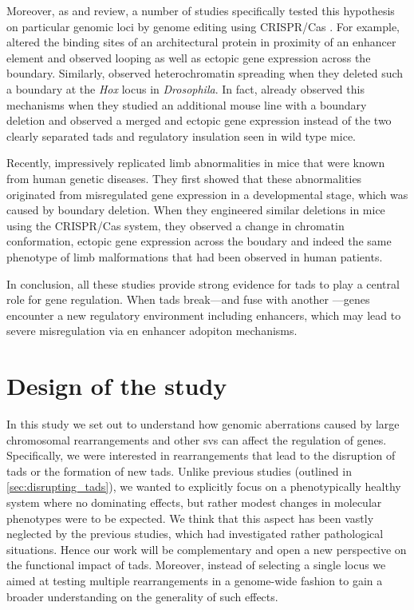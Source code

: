 Moreover, as \citet{Lupianez2016} and \citet{Krijger2016} review, a number of studies
specifically tested this hypothesis on particular genomic loci by genome
editing using CRISPR/Cas \citep{Doudna2014}. For example, \citet{Guo2015} altered
the binding sites of an architectural protein in proximity of an enhancer element
and observed looping as well as ectopic gene expression across the boundary.
Similarly, \citet{Narendra2015} observed heterochromatin spreading when they
deleted such a boundary at the \textit{Hox} locus in \textit{Drosophila}.
In fact, already \citet{Nora2012} observed this mechanisms when they studied an
additional mouse line with a \tad boundary deletion and observed a merged \tad
and ectopic gene expression instead of the two clearly separated \acp{tad} and
regulatory insulation seen in wild type mice.

Recently, \citet{Lupianez2015} impressively replicated limb abnormalities in mice
that were known from human genetic diseases. They first showed that these
abnormalities originated from misregulated gene expression in a developmental
stage, which was caused by \tad boundary deletion. When they engineered similar deletions in
mice using the CRISPR/Cas system, they observed a change in chromatin
conformation, ectopic gene expression across the boudary and indeed the same
phenotype of limb malformations that had been observed in human patients.

In conclusion, all these studies provide strong evidence for \acp{tad} to play
a central role for gene regulation. When \acp{tad} break---and fuse with another
\tad---genes encounter a new regulatory environment including enhancers, which
may lead to severe misregulation via en enhancer adopiton mechanisms.







\section{Design of the study}
\label{sec:balancer_study_design}

In this study we set out to understand how genomic aberrations caused by large
chromosomal rearrangements and other \acp{sv} can affect the regulation of
genes. Specifically, we were interested in rearrangements that lead to the
disruption of \acp{tad} or the formation of new \acp{tad}. Unlike previous
studies (outlined in \cref{sec:disrupting_tads}), we wanted to explicitly
focus on a phenotypically healthy system where no dominating effects, but
rather modest changes in molecular phenotypes were to be expected. We think that
this aspect has been vastly neglected by the previous studies, which had
investigated rather pathological situations. Hence our work will be complementary
and open a new perspective on the functional impact of \acp{tad}.
Moreover, instead of selecting a single locus we aimed at testing
multiple rearrangements in a genome-wide fashion to gain a broader understanding
on the generality of such effects.




